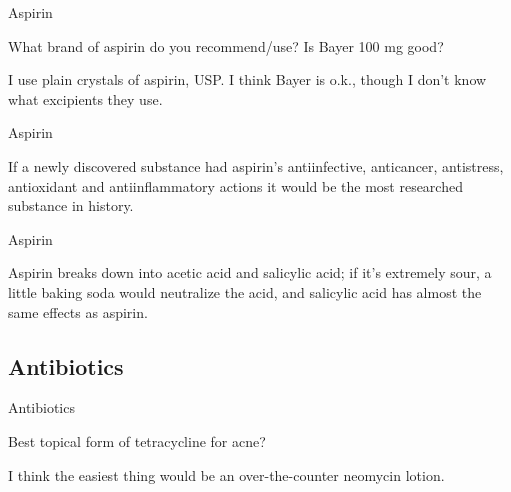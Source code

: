 \documentclass[11pt,oneside,openany,extrafontsizes]{memoir}
\begin{document}
\begin{qaexchange}{Aspirin}

    \begin{question}
        What brand of aspirin do you recommend/use? Is Bayer 100 mg good?
    \end{question}

    \begin{answer}
      I use plain crystals of aspirin, USP. I think Bayer is o.k., though I don't know what excipients they use.
    \end{answer}
\end{qaexchange}

\begin{standalonequote}{Aspirin}

    \begin{answer}
      If a newly discovered substance had aspirin's antiinfective, anticancer, antistress, antioxidant and antiinflammatory actions it would be the most researched substance in history.
    \end{answer}
\end{standalonequote}

\begin{standalonequote}{Aspirin}

    \begin{answer}
      Aspirin breaks down into acetic acid and salicylic acid; if it's extremely sour, a little baking soda would neutralize the acid, and salicylic acid has almost the same effects as aspirin.
    \end{answer}
\end{standalonequote}

\subsection{Antibiotics}

\begin{qaexchange}{Antibiotics}

    \begin{question}
        Best topical form of tetracycline for acne?
    \end{question}

    \begin{answer}
        I think the easiest thing would be an over-the-counter neomycin lotion.
    \end{answer}
\end{qaexchange}
\end{document}

